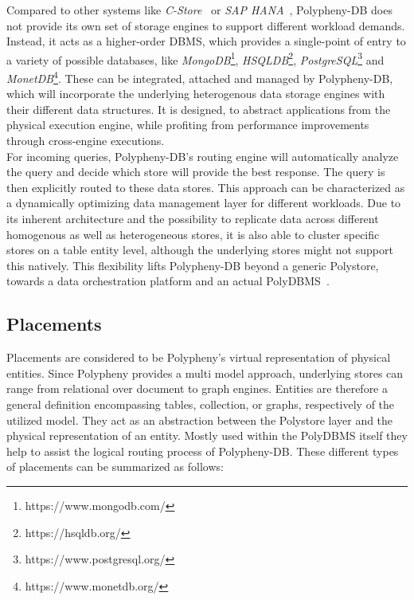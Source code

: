 Compared to other systems like \textit{C-Store}~\cite{cstore_2005} or \textit{SAP HANA}~\cite{hana_2012}, 
Polypheny-DB does not provide its own set of storage engines to support 
different workload demands.\\
Instead, it acts as a higher-order DBMS, which provides a single-point of entry to 
a variety of possible databases, like 
\textit{MongoDB}\footnote{https://www.mongodb.com/}, 
\textit{HSQLDB}\footnote{https://hsqldb.org/},
\textit{PostgreSQL}\footnote{https://www.postgresql.org/} 
and \textit{MonetDB}\footnote{https://www.monetdb.org/}. 
These can be integrated, attached and managed by Polypheny-DB, which will incorporate the underlying 
heterogenous data storage engines with their different data structures. 
It is designed, to abstract applications from the physical execution engine, while profiting from 
performance improvements through cross-engine executions. 
\\
For incoming queries, Polypheny-DB's routing engine will automatically analyze the query and decide 
which store will provide the best response. The query is then explicitly routed to these data stores. 
This approach can be characterized as a dynamically optimizing data management layer for different workloads.
Due to its inherent architecture and the possibility to replicate data across different homogenous as well as heterogeneous stores, it is also able to cluster specific stores 
on a table entity level, although the underlying stores might not support this natively. 
This flexibility lifts Polypheny-DB beyond a generic Polystore, towards a data orchestration platform and an actual PolyDBMS~\cite{polypheny2021}. 




\subsection{Placements}
Placements are considered to be Polypheny's virtual representation of physical entities.
Since Polypheny provides a multi model approach, underlying stores can range from relational over document to graph engines. 
Entities are therefore a general definition encompassing tables, collection, or graphs, respectively of the utilized model.
They act as an abstraction between the Polystore layer and the physical representation of an entity. 
Mostly used within the PolyDBMS itself they help to assist the logical routing process of Polypheny-DB.
These different types of placements can be summarized as follows:


